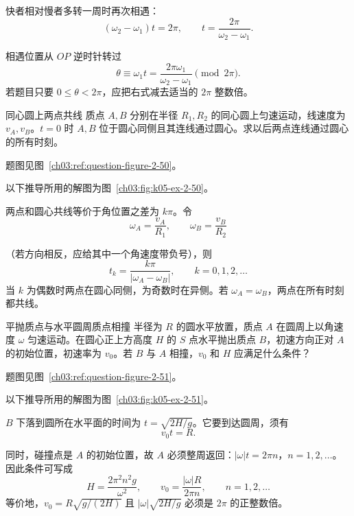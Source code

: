 {\begin{xesolution}
快者相对慢者多转一周时再次相遇：
\[
 (\omega_2-\omega_1)t=2\pi,
 \qquad
 \boxed{t=\frac{2\pi}{\omega_2-\omega_1}}.
\]
\SameCirclePursuitDiagram

相遇位置从 $OP$ 逆时针转过
\[
 \boxed{\theta\equiv\omega_1t
 =\frac{2\pi\omega_1}{\omega_2-\omega_1}\pmod{2\pi}}.
\]
若题目只要 $0\le\theta<2\pi$，应把右式减去适当的 $2\pi$ 整数倍。
\end{xesolution}

\begin{origexamplebox}{同心圆上两点共线}\label{ch03:ex:k05-2-50}
质点 $A,B$ 分别在半径 $R_1,R_2$ 的同心圆上匀速运动，线速度为 $v_A,v_B$。$t=0$ 时 $A,B$ 位于圆心同侧且其连线通过圆心。求以后两点连线通过圆心的所有时刻。
\par 题图见图~\ref{ch03:ref:question-figure-2-50}。
\KQuestionBY
\end{origexamplebox}
\begin{xesolution}
以下推导所用的解图为图~\ref{ch03:fig:k05-ex-2-50}。

两点和圆心共线等价于角位置之差为 $k\pi$。令
\[
\omega_A=\frac{v_A}{R_1},\qquad \omega_B=\frac{v_B}{R_2}
\]
\ConcentricCollinearityDiagram

（若方向相反，应给其中一个角速度带负号），则
\[
 \boxed{t_k=\frac{k\pi}{|\omega_A-\omega_B|}},\qquad k=0,1,2,\ldots
\]
当 $k$ 为偶数时两点在圆心同侧，为奇数时在异侧。若 $\omega_A=\omega_B$，两点在所有时刻都共线。
\end{xesolution}

\begin{origexamplebox}{平抛质点与水平圆周质点相撞}\label{ch03:ex:k05-2-51}
半径为 $R$ 的圆水平放置，质点 $A$ 在圆周上以角速度 $\omega$ 匀速运动。在圆心正上方高度 $H$ 的 $S$ 点水平抛出质点 $B$，初速方向正对 $A$ 的初始位置，初速率为 $v_0$。若 $B$ 与 $A$ 相撞，$v_0$ 和 $H$ 应满足什么条件？
\par 题图见图~\ref{ch03:ref:question-figure-2-51}。
\KQuestionBZ
\end{origexamplebox}
\begin{xesolution}
以下推导所用的解图为图~\ref{ch03:fig:k05-ex-2-51}。

$B$ 下落到圆所在水平面的时间为 $t=\sqrt{2H/g}$。它要到达圆周，须有
\[
 v_0t=R.
\]
\ProjectileCircleCollisionDiagram

同时，碰撞点是 $A$ 的初始位置，故 $A$ 必须整周返回：$|\omega|t=2\pi n$，$n=1,2,\ldots$。因此条件可写成
\[
 \boxed{H=\frac{2\pi^2n^2g}{\omega^2}},\qquad
 \boxed{v_0=\frac{|\omega|R}{2\pi n}},\qquad n=1,2,\ldots
\]
等价地，$v_0=R\sqrt{g/(2H)}$ 且 $|\omega|\sqrt{2H/g}$ 必须是 $2\pi$ 的正整数倍。
\end{xesolution}

}

